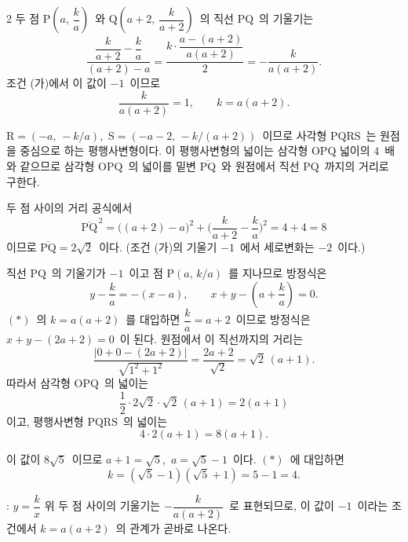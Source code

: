 \documentclass[10pt,fleqn]{article}
\begin{document}
\begin{multicols*}{2}
두 점 $\mathrm{P}\!\left(a,\, \dfrac{k}{a}\right)$\ 와 $\mathrm{Q}\!\left(a+2,\, \dfrac{k}{a+2}\right)$\ 의 직선 $\mathrm{PQ}$\ 의 기울기는
\[ \dfrac{\dfrac{k}{a+2}-\dfrac{k}{a}}{(a+2)-a}=\dfrac{k\cdot\dfrac{a-(a+2)}{a(a+2)}}{2}=-\dfrac{k}{a(a+2)}. \]
조건 (가)에서 이 값이 $-1$\ 이므로
\[ \dfrac{k}{a(a+2)}=1,\qquad k=a(a+2). \tag{$\ast$} \]

$\mathrm{R}=(-a,\, -k/a)$,\ $\mathrm{S}=(-a-2,\, -k/(a+2))$\ 이므로 사각형 $\mathrm{PQRS}$\ 는 원점을 중심으로 하는 평행사변형이다. 이 평행사변형의 넓이는 삼각형 $\mathrm{OPQ}$ 넓이의 $4$\ 배와 같으므로 삼각형 $\mathrm{OPQ}$\ 의 넓이를 밑변 $\overline{\mathrm{PQ}}$\ 와 원점에서 직선 $\mathrm{PQ}$\ 까지의 거리로 구한다.

두 점 사이의 거리 공식에서
\[ \overline{\mathrm{PQ}}^{\,2}=\bigl((a+2)-a\bigr)^{2}+\bigl(\dfrac{k}{a+2}-\dfrac{k}{a}\bigr)^{2}=4+4=8 \]
이므로 $\overline{\mathrm{PQ}}=2\sqrt{2}$\ 이다. (조건 (가)의 기울기 $-1$\ 에서 세로변화는 $-2$\ 이다.)

직선 $\mathrm{PQ}$\ 의 기울기가 $-1$\ 이고 점 $\mathrm{P}(a,\, k/a)$\ 를 지나므로 방정식은
\[ y-\dfrac{k}{a}=-(x-a),\qquad x+y-\left(a+\dfrac{k}{a}\right)=0. \]
$(\ast)$\ 의 $k=a(a+2)$\ 를 대입하면 $\dfrac{k}{a}=a+2$\ 이므로 방정식은 $x+y-(2a+2)=0$\ 이 된다. 원점에서 이 직선까지의 거리는
\[ \dfrac{|0+0-(2a+2)|}{\sqrt{1^{2}+1^{2}}}=\dfrac{2a+2}{\sqrt{2}}=\sqrt{2}\,(a+1). \]
따라서 삼각형 $\mathrm{OPQ}$\ 의 넓이는
\[ \dfrac{1}{2}\cdot 2\sqrt{2}\cdot \sqrt{2}\,(a+1)=2(a+1) \]
이고, 평행사변형 $\mathrm{PQRS}$\ 의 넓이는
\[ 4\cdot 2(a+1)=8(a+1). \]

이 값이 $8\sqrt{5}$\ 이므로 $a+1=\sqrt{5}$,\ $a=\sqrt{5}-1$\ 이다. $(\ast)$\ 에 대입하면
\[ k=(\sqrt{5}-1)(\sqrt{5}+1)=5-1=4. \]

\begin{dmcriticalpoint}
: $y=\dfrac{k}{x}$ 위 두 점 사이의 기울기는 $-\dfrac{k}{a(a+2)}$\ 로 표현되므로, 이 값이 $-1$\ 이라는 조건에서 $k=a(a+2)$\ 의 관계가 곧바로 나온다.
\end{dmcriticalpoint}

\end{multicols*}
\end{document}
